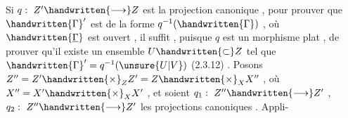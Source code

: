 Si $q:\ Z'\handwritten{\longrightarrow} Z$ est la projection canonique , pour prouver que $\handwritten{\Gamma}'$ est de la forme  $q^{-1}(\handwritten{\Gamma})$ , où $\handwritten{\underline{\Gamma}}$ est ouvert  , il suffit , puisque $q$ est un morphisme  plat  , de prouver  qu'il existe un ensemble $U\handwritten{\subset} Z$ tel que $\handwritten{\Gamma}'=q^{-1}(\unsure{U|V})$ (2.3.12) . Posons $Z''=Z'\handwritten{\times}_Z Z'=Z\handwritten{\times}_X X''$ , où $X''=X'\handwritten{\times}_X X'$ , et soient $q_1:\ Z''\handwritten{\longrightarrow} Z'$ , $q_2:\ Z''\handwritten{\longrightarrow} Z'$ les projections canoniques . Appli-
